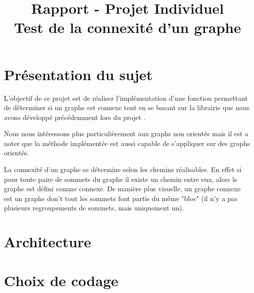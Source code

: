 
\title{Rapport - Projet Individuel \\\Large Test de la connexité d'un graphe}
\fancyhf{}
\lhead{\leftmark}


	\maketitle
	\tableofcontents
	\chapter{Présentation du sujet}
		L'objectif de ce projet est de réaliser l'implémentation d'une fonction permettant de déterminer si un graphe est connexe tout en se basant sur la librairie que nous avons développé précédemment lors du projet .		
		
		Nous nous intéressons plus particulièrement aux graphs non orientés mais il est a noter que la méthode implémentée est aussi capable de s'appliquer sur des graphs orientés.
		
		La connexité d'un graphe se détermine selon les chemins réalisables. En effet si pour toute paire de sommets du graphe il existe un chemin entre eux, alors le graphe est défini comme connexe. De manière plus visuelle, un graphe connexe est un graphe don't tout les sommets font partis du même "bloc" (il n'y a pas plusieurs regroupements de sommets, mais uniquement un).
	
	\chapter{Architecture}
		
		
		
		
	\chapter{Choix de codage}
		
		
		
